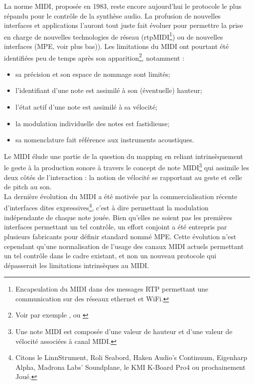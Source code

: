\noindent La norme \gls{MIDI}, proposée en 1983, reste encore aujourd'hui le protocole le plus répandu pour le contrôle de la synthèse audio. La profusion de nouvelles interfaces et applications l'auront tout juste fait évoluer pour permettre la prise en charge de nouvelles technologies de réseau (rtpMIDI\footnote{ Encapsulation du \gls{MIDI} dans des messages \gls{RTP} permettant une communication sur des réseaux ethernet et WiFi.}) ou de nouvelles interfaces (\gls{MPE}, voir plus bas)).
Les limitations du \gls{MIDI} ont pourtant été identifiées peu de temps après son apparition\footnote{Voir par exemple \cite{moore_dysfunctions_1988}, \cite{mcmillen_zipi_1994} ou \cite{selfridge-field_beyond_1997}}, notamment :
\vspace{-1em}
\begin{itemize}[noitemsep]
	\item sa précision et son espace de nommage sont limités;
	\item l'identifiant d'une note est assimilé à son (éventuelle) hauteur;
	\item l'état actif d'une note est assimilé à sa vélocité;
	\item la modulation individuelle des notes est fastidieuse;
	\item sa nomenclature fait référence aux instruments acoustiques.
\end{itemize}

\noindent Le \gls{MIDI} élude une partie de la question du mapping en reliant intrinsèquement le geste à la production sonore à travers le concept de note \gls{MIDI}\footnote{ Une note \gls{MIDI} est composée d'une valeur de hauteur et d'une valeur de vélocité associées à canal \gls{MIDI}.} qui assimile les deux côtés de l'interaction : la notion de vélocité se rapportant au geste et celle de pitch au son.\\
\indent La dernière évolution du \gls{MIDI} a été motivée par la commercialisation récente d'interfaces dites expressives\footnote{ Citons le LinnStrument, Roli Seabord, Haken Audio’s Continuum, Eigenharp Alpha, Madrona Labs’ Soundplane, le KMI K-Board Pro4 ou prochainement Joué.}, c'est à dire permettant la modulation indépendante de chaque note jouée. Bien qu'elles ne soient pas les premières interfaces permettant un tel contrôle, un effort conjoint a été entrepris par plusieurs fabricants pour définir standard nommé \gls{MPE}. Cette évolution n'est cependant qu'une normalisation de l'usage des canaux \gls{MIDI} actuels permettant un tel contrôle dans le cadre existant, et non un nouveau protocole qui dépasserait les limitations intrinsèques au \gls{MIDI}.

